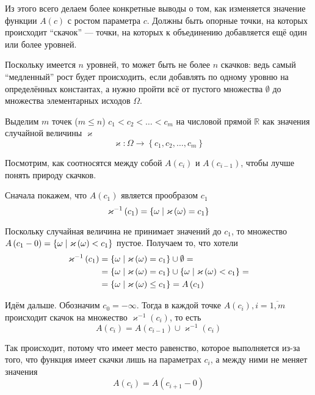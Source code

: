 Из этого всего делаем более конкретные выводы о том,
как изменяется значение функции $A\left( c \right)$ с ростом параметра $c$.
Должны быть опорные точки, на которых происходит ``скачок'' ---
точки, на которых к объединению добавляется ещё один или более уровней.

Поскольку имеется $n$ уровней, то может быть не более $n$ скачков:
ведь самый ``медленный'' рост будет происходить,
если добавлять по одному уровню на определённых константах,
а нужно пройти всё от пустого множества $\emptyset$
до множества элементарных исходов $\Omega$.

Выделим $m$ точек ($m \le n$) $c_1<c_2<\dots<c_m$
на числовой прямой $\mathbb{R}$ как значения случайной величины $\varkappa$
$$\varkappa: \Omega \rightarrow \left\{ c_1, c_2, \dots, c_m \right\}$$

Посмотрим, как соотносятся между собой
$A\left( c_i \right)$ и $A\left( c_{i-1} \right)$,
чтобы лучше понять природу скачков.

Сначала покажем, что $A\left( c_1 \right)$ является прообразом $c_1$
$$\varkappa^{-1}\left( c_1 \right)
  = \left\{ \omega \;\middle|\; \varkappa\left( \omega \right) = c_1 \right\}$$

Поскольку случайная величина не принимает значений до $c_1$,
то множество $A\left( c_1-0 \right)
=\left\{ \omega \;\middle|\; \varkappa\left( \omega \right) < c_1 \right\}$ пустое.
Получаем то, что хотели
\begin{align*}
  \varkappa^{-1}\left( c_1 \right)
      &= \left\{ \omega \;\middle|\; \varkappa\left( \omega \right) = c_1 \right\}
      \cup \emptyset = \\
      &= \left\{ \omega \;\middle|\; \varkappa\left( \omega \right) = c_1 \right\}
      \cup \left\{ \omega
          \;\middle|\; \varkappa\left( \omega \right) < c_1 \right\} = \\
      &= \left\{ \omega \;\middle|\; \varkappa\left( \omega \right) \le c_1 \right\}
      = A\left( c_1 \right)
\end{align*}

Идём дальше. Обозначим $c_0 = -\infty$.
Тогда в каждой точке $A\left( c_i \right), i = \overline{1,m}$
происходит скачок на множество $\varkappa^{-1}\left( c_i \right)$, то есть 
$$A\left( c_i \right)
  = A\left( c_{i-1} \right) \cup \varkappa^{-1}\left( c_i \right)$$

Так происходит, потому что имеет место равенство,
которое выполняется из-за того,
что функция имеет скачки лишь на параметрах $c_i$,
а между ними не меняет значения
$$A\left( c_i \right) = A\left( c_{i+1} - 0 \right)$$

